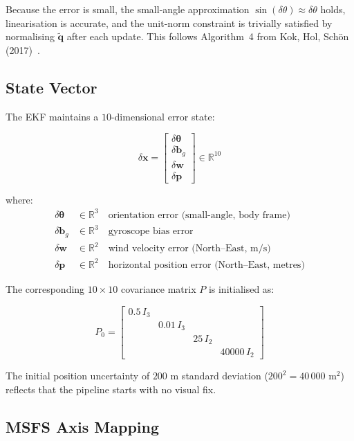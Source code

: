 \documentclass[12pt,a4paper]{article}
\newcommand{\R}{\mathbb{R}}
\newcommand{\bx}{\mathbf{x}}
\newcommand{\bq}{\mathbf{q}}
\newcommand{\bp}{\mathbf{p}}
\newcommand{\bw}{\mathbf{w}}
\newcommand{\btheta}{\boldsymbol{\theta}}
\begin{document}
Because the error is small, the small-angle approximation
$\sin(\delta\theta) \approx \delta\theta$ holds, linearisation is accurate,
and the unit-norm constraint is trivially satisfied by normalising $\tilde{\bq}$
after each update. This follows Algorithm~4 from Kok, Hol, Sch\"{o}n
(2017)~\cite{kok2017}.

\subsection{State Vector}

The EKF maintains a $10$-dimensional error state:

\begin{equation}
    \delta\bx =
    \begin{bmatrix}
        \delta\btheta \\ \delta\mathbf{b}_g \\ \delta\bw \\ \delta\bp
    \end{bmatrix} \in \R^{10}
    \label{eq:error_state}
\end{equation}

where:
\begin{align*}
    \delta\btheta &\in \R^3 \quad \text{orientation error (small-angle, body frame)} \\
    \delta\mathbf{b}_g &\in \R^3 \quad \text{gyroscope bias error} \\
    \delta\bw &\in \R^2 \quad \text{wind velocity error (North--East, m/s)} \\
    \delta\bp &\in \R^2 \quad \text{horizontal position error (North--East, metres)}
\end{align*}

The corresponding $10 \times 10$ covariance matrix $P$ is initialised as:

\begin{equation}
    P_0 =
    \begin{bmatrix}
        0.5 \, I_3 & & & \\
        & 0.01 \, I_3 & & \\
        & & 25 \, I_2 & \\
        & & & 40000 \, I_2
    \end{bmatrix}
\end{equation}

The initial position uncertainty of $200$ m standard deviation ($200^2 = 40\,000$
m$^2$) reflects that the pipeline starts with no visual fix.

\subsection{MSFS Axis Mapping}
\end{document}
